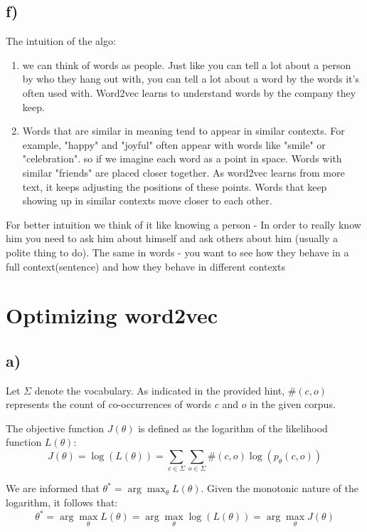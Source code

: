 \documentclass{article}
\begin{document}
\subsection*{f)}
The intuition of the algo:
\begin{enumerate}
    \item we can think of words as people. Just like you can tell a lot about a person by who they hang out with, you can tell a lot about a word by the words it's often used with.
    Word2vec learns to understand words by the company they keep.
    
    \item Words that are similar in meaning tend to appear in similar contexts. For example, "happy" and "joyful" often appear with words like "smile" or "celebration".
    so if we imagine each word as a point in space. Words with similar "friends" are placed closer together.
    As word2vec learns from more text, it keeps adjusting the positions of these points. Words that keep showing up in similar contexts move closer to each other.
    
\end{enumerate}

For better intuition we think of it like knowing a person -  In order to really know him you need to ask him about himself and ask others about him (usually a polite thing to do).
The same in words - you want to see how they behave in a full context(sentence) and how they behave in different contexts
\clearpage
\section{Optimizing word2vec}

\subsection*{a)}

Let $\Sigma$ denote the vocabulary. As indicated in the provided hint, $\#(c,o)$ represents the count of co-occurrences of words $c$ and $o$ in the given corpus.

The objective function $J(\theta)$ is defined as the logarithm of the likelihood function $L(\theta)$:
\[
J(\theta) = \log(L(\theta)) = \sum_{c \in \Sigma} \sum_{o \in \Sigma} \#(c,o) \log(p_{\theta}(c, o))
\]

We are informed that $\theta^{*} = \arg\max_{\theta} L(\theta)$. Given the monotonic nature of the logarithm, it follows that:
\[
\theta^{*} = \arg\max_{\theta} L(\theta) = \arg\max_{\theta} \log(L(\theta)) = \arg\max_{\theta} J(\theta)
\]
\end{document}
